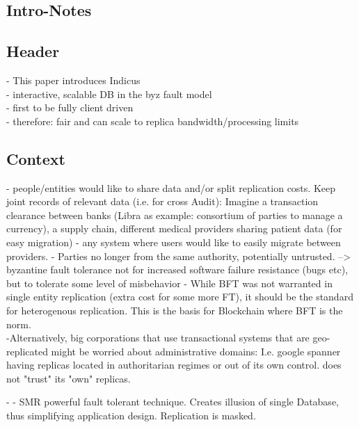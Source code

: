 \subsection{Intro-Notes}

\subsection{Header}

 - This paper introduces Indicus\\
 - interactive, scalable DB in the byz fault model\\
 - first to be fully client driven\\
 - therefore: fair and can scale to replica bandwidth/processing limits
 
 \subsection{Context}
 - people/entities would like to share data and/or split replication costs. Keep joint records of relevant data (i.e. for cross Audit): Imagine a transaction clearance between banks  (Libra as example: consortium of parties to manage a currency), a supply chain, different medical providers sharing patient data (for easy migration) - any system where users would like to easily migrate between providers.
 - Parties no longer from the same authority, potentially untrusted. --> byzantine fault tolerance not for increased software failure resistance (bugs etc), but to tolerate some level of misbehavior
 - While BFT was not warranted in single entity replication (extra cost for some more FT), it should be the standard for heterogenous replication. This is the basis for Blockchain where BFT is the norm.\\
 -Alternatively, big corporations that use transactional systems that are geo-replicated might be worried about administrative domains: I.e. google spanner having replicas located in authoritarian regimes or out of its own control. does not "trust" its "own" replicas.
 
 -
 - SMR powerful fault tolerant technique. Creates illusion of single Database, thus simplifying application design. Replication is masked.
  \\
 
